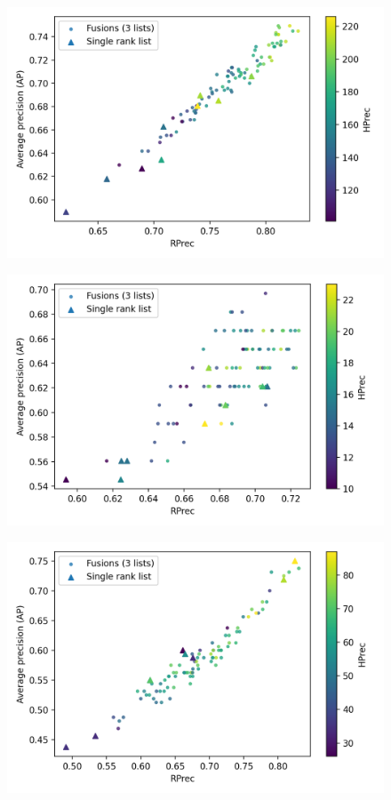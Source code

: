 \begin{figure}
  \includegraphics[width=\linewidth]{img/fusion_st_jean.png}
  \caption{}
  \label{fig:fusion_st_jean}
\end{figure}
\begin{figure}
  \includegraphics[width=\linewidth]{img/fusion_brunet.png}
  \caption{}
  \label{fig:fusion_brunet}
\end{figure}
\begin{figure}
  \includegraphics[width=\linewidth]{img/fusion_oxquarry.png}
  \caption{}
  \label{fig:fusion_oxquarry}
\end{figure}


